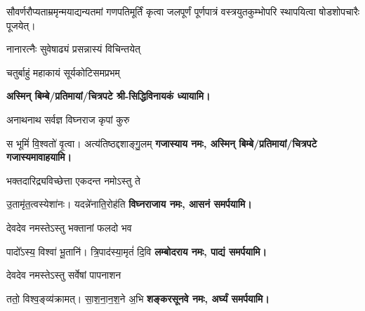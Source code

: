 



\begingroup
\renewcommand{\devaName}{देव}

\endgroup








सौवर्णरौप्यताम्रमृन्मयाद्यन्यतमां गणपतिमूर्तिं कृत्वा जलपूर्णं पूर्णपात्रं वस्त्रयुतकुम्भोपरि स्थापयित्वा
षोडशोपचारैः पूजयेत्।

\renewcommand{\devAya}{श्री-सिद्धिविनायकाय}
\begin{center}

{नानारत्नैः सुवेषाढ्यं प्रसन्नास्यं विचिन्तयेत्}

{चतुर्बाहुं महाकायं सूर्यकोटिसमप्रभम्}

\textbf{अस्मिन् बिम्बे/प्रतिमायां/चित्रपटे श्री-सिद्धिविनायकं ध्यायामि।}

{अनाथनाथ सर्वज्ञ विघ्नराज कृपां कुरु}

{स भूमिं॑ वि॒श्वतो॑ वृ॒त्वा। अत्य॑तिष्ठद्दशाङ्गु॒लम्}
\textbf{गजास्याय नमः, अस्मिन् बिम्बे/प्रतिमायां/चित्रपटे गजास्यमावाहयामि।}
\medskip

{भक्तदारिद्र्यविच्छेत्ता एकदन्त नमोऽस्तु ते}

{उ॒तामृ॑त॒त्वस्येशा॑नः। यदन्ने॑नाति॒रोह॑ति}
\textbf{विघ्नराजाय नमः, आसनं समर्पयामि।}
\medskip

{देवदेव नमस्तेऽस्तु भक्तानां फलदो भव}

{पादो᳚ऽस्य॒ विश्वा॑ भू॒तानि॑। त्रि॒पाद॑स्या॒मृतं॑ दि॒वि}
\textbf{लम्बोदराय नमः, पाद्यं समर्पयामि।}
\medskip

{देवदेव नमस्तेऽस्तु सर्वेषां पापनाशन}

{ततो॒ विश्व॒ङ्व्य॑क्रामत्। सा॒श॒ना॒न॒श॒ने अ॒भि}
\textbf{शङ्करसूनवे नमः, अर्घ्यं समर्पयामि।}
\medskip


\end{center}
